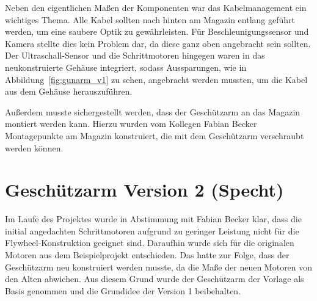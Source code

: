 Neben den eigentlichen Maßen der Komponenten war das Kabelmanagement ein wichtiges Thema. Alle Kabel sollten nach hinten am Magazin entlang geführt werden, um eine saubere Optik zu gewährleisten. Für Beschleunigungssensor und Kamera stellte dies kein Problem dar, da diese ganz oben angebracht sein sollten. Der Ultraschall-Sensor und die Schrittmotoren hingegen waren in das neukonstruierte Gehäuse integriert, sodass Aussparungen, wie in Abbildung~\ref{fig:gunarm_v1} zu sehen, angebracht werden mussten, um die Kabel aus dem Gehäuse herauszuführen.

Außerdem musste sichergestellt werden, dass der Geschützarm an das Magazin montiert werden kann. Hierzu wurden vom Kollegen Fabian Becker Montagepunkte am Magazin konstruiert, die mit dem Geschützarm verschraubt werden können.

\section{Geschützarm Version 2 (Specht)}

Im Laufe des Projektes wurde in Abstimmung mit Fabian Becker klar, dass die initial angedachten Schrittmotoren aufgrund zu geringer Leistung nicht für die Flywheel-Konstruktion geeignet sind. Daraufhin wurde sich für die originalen Motoren aus dem Beispielprojekt \cite{cad_turret_blueprint} entschieden. Das hatte zur Folge, dass der Geschützarm neu konstruiert werden musste, da die Maße der neuen Motoren von den Alten abwichen. Aus diesem Grund wurde der Geschützarm der Vorlage \cite{cad_turret_blueprint} als Basis genommen und die Grundidee der Version 1 beibehalten.

